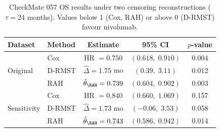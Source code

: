 \begin{table}[ht]
\centering
\caption{CheckMate 057 OS results under two censoring reconstructions
  ($\tau=24$ months).
  Values below 1 (Cox, RAH) or above 0 (D-RMST) favour nivolumab.}
\label{tab:results-cm057-intro}
\medskip
\begin{tabular}{llccc}
\toprule
Dataset & Method & Estimate & 95\% CI & $p$-value \\
\midrule
\multirow{3}{*}{Original} & Cox  & HR $= 0.750$ & $(0.618,\; 0.910)$ & 0.004 \\
  & D-RMST  & $\hat\Delta = 1.75$ mo & $(0.39,\; 3.11)$ & 0.012 \\
  & RAH  & $\hat\theta_{\RAH} = 0.739$ & $(0.604,\; 0.902)$ & 0.003 \\
\midrule
\multirow{3}{*}{Sensitivity} & Cox  & HR $= 0.840$ & $(0.660,\; 1.069)$ & 0.157 \\
  & D-RMST  & $\hat\Delta = 1.73$ mo & $(-0.06,\; 3.53)$ & 0.058 \\
  & RAH  & $\hat\theta_{\RAH} = 0.743$ & $(0.586,\; 0.942)$ & 0.014 \\
\bottomrule
\end{tabular}
\end{table}

